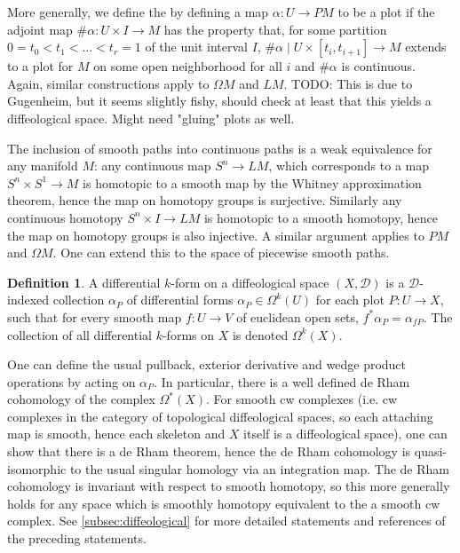 \documentclass{scrartcl}
\let\emph\relax
\theoremstyle{plain}
\theoremstyle{definition}
\newtheorem{definition}[theorem]{Definition}
\begin{document}
More generally, we define the \emph{diffeology on the space of piecewise smooth paths} by defining a map $\alpha\colon U\to PM$ to be a plot if the adjoint map $\#\alpha\colon U\times I\to M$ has the property that, for some partition $0=t_0<t_1<\dots<t_r=1$ of the unit interval $I$, $\#\alpha\mid U\times[t_i, t_{i+1}]\to M$ extends to a plot for $M$ on some open neighborhood for all $i$ and $\#\alpha$ is continuous. Again, similar constructions apply to $\Omega M$ and $LM$. TODO: This is due to Gugenheim, but it seems slightly fishy, should check at least that this yields a diffeological space. Might need "gluing" plots as well.

The inclusion of smooth paths into continuous paths is a weak equivalence for any manifold $M$: any continuous map $S^n\to LM$, which corresponds to a map $S^n\times S^1\to M$ is homotopic to a smooth map by the Whitney approximation theorem, hence the map on homotopy groups is surjective. Similarly any continuous homotopy $S^n\times I\to LM$ is homotopic to a smooth homotopy, hence the map on homotopy groups is also injective. A similar argument applies to $PM$ and $\Omega M$. One can extend this to the space of piecewise smooth paths.

\begin{definition}
    A differential $k$-form on a diffeological space $(X,\mathcal D)$ is a $\mathcal D$-indexed collection $\alpha_P$ of differential forms $\alpha_P\in \Omega^k(U)$ for each plot $P\colon U\to X$, such that for every smooth map $f\colon U\to V$ of euclidean open sets, $f^*\alpha_P = \alpha_{fP}$. The collection of all differential $k$-forms on $X$ is denoted $\Omega^k(X)$. 
\end{definition}

One can define the usual pullback, exterior derivative and wedge product operations by acting on $\alpha_P$. In particular, there is a well defined de Rham cohomology of the complex $\Omega^*(X)$. For smooth cw complexes (i.e. cw complexes in the category of topological diffeological spaces, so each attaching map is smooth, hence each skeleton and $X$ itself is a diffeological space), one can show that there is a de Rham theorem, hence the de Rham cohomology is quasi-isomorphic to the usual singular homology via an integration map. The de Rham cohomology is invariant with respect to smooth homotopy, so this more generally holds for any space which is smoothly homotopy equivalent to the a smooth cw complex. See \ref{subsec:diffeological} for more detailed statements and references of the preceding statements. 
\end{document}
